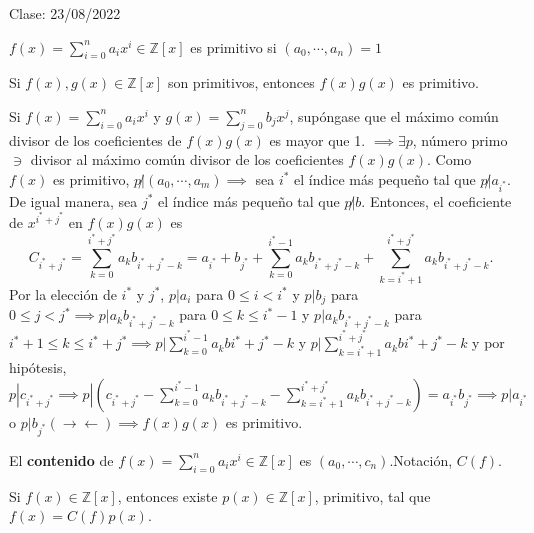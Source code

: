 Clase: 23/08/2022

\begin{definicion}
    $f(x)=\sum_{i=0}^n a_ix^i\in \mathbb{Z}[x]$ es primitivo si $(a_0,\cdots, a_n)=1$
\end{definicion}

\begin{lema}[3.23]
    Si $f(x),g(x)\in \mathbb{Z}[x]$ son primitivos, entonces $f(x)g(x)$ es primitivo. 
    \begin{dem}
        Si $f(x)=\sum_{i=0}^n a_ix^i$ y $g(x)=\sum_{j=0}^n b_jx^j$, supóngase que el máximo común divisor de los coeficientes de $f(x)g(x)$ es mayor que 1. $\implies \exists p$, número primo $\ni$ divisor al máximo común divisor de los coeficientes $f(x)g(x)$. Como $f(x)$ es primitivo, $p\not | (a_0,\cdots, a_m)\implies$ sea $i^*$ el índice más pequeño tal que $p\not | a_{i^*}$. De igual manera, sea $j^{*}$ el índice más pequeño tal que $p\not|b$. Entonces, el coeficiente de $x^{i^* +j^*}$ en $f(x)g(x)$ es 
        $$C_{i^*+j^*}=\sum_{k=0}^{i^*+j^*}a_kb_{i^*+j^*-k}=a_{i^*}+b_{j^*}+\sum_{k=0}^{i^*-1}a_kb_{i^*+j^*-k}+\sum_{k=i^*+1}^{i^*+j^*}a_kb_{i^*+j^*-k}.$$
        Por la elección de $i^*$ y $j^*$, $p|a_i$ para $0\leq i<i^*$ y $p|b_j$ para $0\leq j<j^*\implies p|a_kb_{i^*+j^*-k}$ para $0\leq k\leq i^*-1$ y $p|a_kb_{i^*+j^*-k}$ para $i^*+1\leq k\leq i^*+j^*\implies p|\sum_{k=0}^{i^*-1}a_kb{i^*+j^*-k}$ y $p|\sum_{k=i^*+1}^{i^*+j^*}a_kb{i^*+j^*-k}$ y por hipótesis, $p|c_{i^*+j^*}\implies p|\left(c_{i^*+j^*}-\sum_{k=0}^{i^*-1}a_kb_{i^*+j^*-k}-\sum_{k=i^*+1}^{i^*+j^*}a_kb_{i^*+j^*-k}\right)=a_{i^*}b_{j^*}\implies p|a_{i^*}$ o $p|b_{j^*}(\to\gets)\implies f(x)g(x)$ es primitivo.  
    \end{dem}
\end{lema}

\begin{definicion}
    El \textbf{contenido} de $f(x)=\sum_{i=0}^n a_ix^i\in\mathbb{Z}[x]$ es $(a_0,\cdots,c_n)$.Notación, $C(f)$.
\end{definicion}

\begin{prop}
    Si $f(x)\in\mathbb{Z}[x]$, entonces existe $p(x)\in \mathbb{Z}[x]$, primitivo, tal que $f(x)=C(f)p(x)$.
\end{prop}

